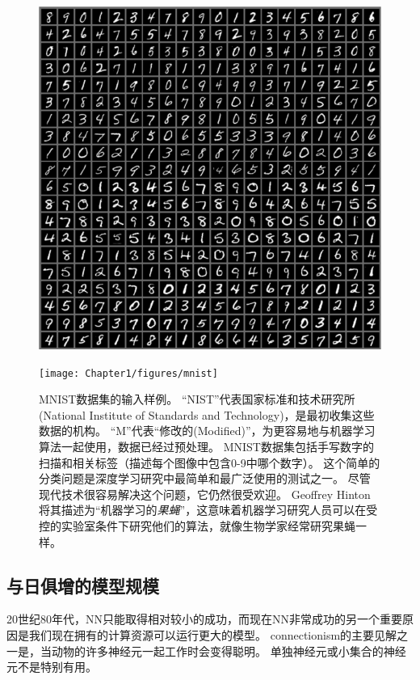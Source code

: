 \begin{figure}[!htb]
\ifOpenSource
\centerline{\includegraphics[scale=0.5]{images/9.png}}
\else
\centerline{\texttt{[image: Chapter1/figures/mnist]}}
\fi
\caption{MNIST数据集的输入样例。
``NIST''代表国家标准和技术研究所(National Institute of Standards and Technology)，是最初收集这些数据的机构。
``M''代表``修改的(Modified)''，为更容易地与机器学习算法一起使用，数据已经过预处理。
MNIST数据集包括手写数字的扫描和相关标签（描述每个图像中包含0-9中哪个数字）。
这个简单的分类问题是深度学习研究中最简单和最广泛使用的测试之一。
尽管现代技术很容易解决这个问题，它仍然很受欢迎。
Geoffrey Hinton将其描述为``机器学习的\emph{果蝇}''，这意味着机器学习研究人员可以在受控的实验室条件下研究他们的算法，就像生物学家经常研究果蝇一样。
}
\label{fig:chap1_mnist}
\end{figure}


\subsection{与日俱增的模型规模}
\label{sec:increasing_model_sizes}


20世纪80年代，\gls{NN}只能取得相对较小的成功，而现在\gls{NN}非常成功的另一个重要原因是我们现在拥有的计算资源可以运行更大的模型。
\gls{connectionism}的主要见解之一是，当动物的许多神经元一起工作时会变得聪明。
单独神经元或小集合的神经元不是特别有用。


